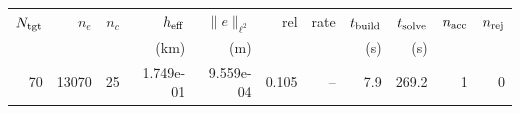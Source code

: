 \begin{tabular}{rrrrrrrrrrr}
\hline
$N_{\rm tgt}$ & $n_e$ & $n_c$ & $h_{\rm eff}$ & $\|e\|_{\ell^2}$ & rel & rate & $t_{\rm build}$ & $t_{\rm solve}$ & $n_{\rm acc}$ & $n_{\rm rej}$ \\
 & & & (km) & (m) & & & (s) & (s) & & \\
\hline
70 & 13070 & 25 & 1.749e-01 & 9.559e-04 & 0.105 & -- & 7.9 & 269.2 & 1 & 0 \\
\hline
\end{tabular}
